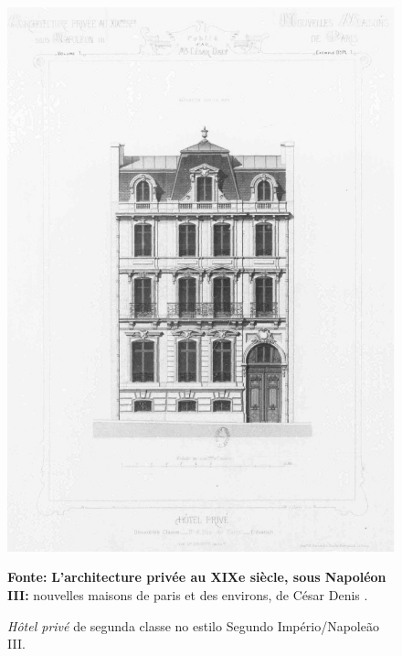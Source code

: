\begin{figure}[!htp]
\centering
\caption{\textit{Hôtel privé} de segunda classe no estilo Segundo Império/Napoleão III.} 
\includegraphics[width=1\textwidth]{2-cap1/complementos/fotos/daly01-1.JPEG}{\par \footnotesize \textbf{Fonte:} \textbf{L’architecture privée au XIXe siècle, sous Napoléon III:} nouvelles maisons de paris et des environs, de César Denis . \par}
\label{fig:hotelsegclas} 
\end{figure}

